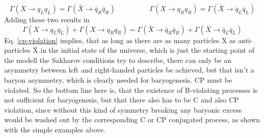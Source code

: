 \begin{equation*}
	\Gamma(X\rightarrow q_Lq_L)=\Gamma(\bar{X}\rightarrow \bar{q}_R\bar{q}_R)\hspace{2cm}\Gamma(X\rightarrow q_Rq_R)=\Gamma(\bar{X}\rightarrow \bar{q}_L\bar{q}_L)
\end{equation*}
Adding these two results in 
\begin{equation}
\Gamma(X\rightarrow q_Lq_L)+\Gamma(X\rightarrow q_Rq_R)=\Gamma(\bar{X}\rightarrow \bar{q}_R\bar{q}_R)+\Gamma(\bar{X}\rightarrow \bar{q}_L\bar{q}_L)
\label{cp-violation}
\end{equation}
Eq. \ref{cp-violation} implies, that as long as there are as many particles X as anti-particles $\bar{\text{X}}$ in the initial state of the universe, which is just the starting point of the modell the Sakharov conditions try to describe, there can only be an asymmetry between left and right-handed particles be achieved, but that isn't a baryon asymmetry, which is clearly needed for baryogenesis. CP must be violated.\newline
So the bottom line here is, that the existence of B-violating processes is not sufficient for baryogenesis, but that there also has to be C and also CP violation, since without this kind of symmetry breaking any baryonic excess would be washed out by the corresponding C or CP conjugated process, as shown with the simple examples above. 
